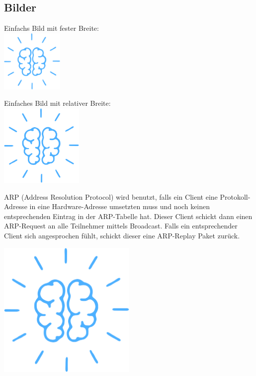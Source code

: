 \subsection{Bilder}

Einfachs Bild mit fester Breite:\\
\includegraphics[width=3cm]{rec/aBrain-Logo}
\vspace{10mm}

Einfaches Bild mit relativer Breite:\\
\includegraphics[width=0.3\textwidth]{rec/aBrain-Logo}
\vspace{1cm}

\begin{minipage}{0.7\textwidth}
ARP (Address Resolution Protocol) wird benutzt, falls ein Client eine Protokoll-Adresse in eine Hardware-Adresse umsetzten muss und noch keinen entsprechenden Eintrag in der ARP-Tabelle hat. Dieser Client schickt dann einen ARP-Request an alle Teilnehmer mittels Broadcast. Falls ein entsprechender Client sich angesprochen fühlt, schickt dieser eine ARP-Replay Paket zurück.
\end{minipage}
\begin{minipage}{0.3\textwidth}
	\centering
	\includegraphics[width=0.5\textwidth]{rec/aBrain-Logo}
\end{minipage}


